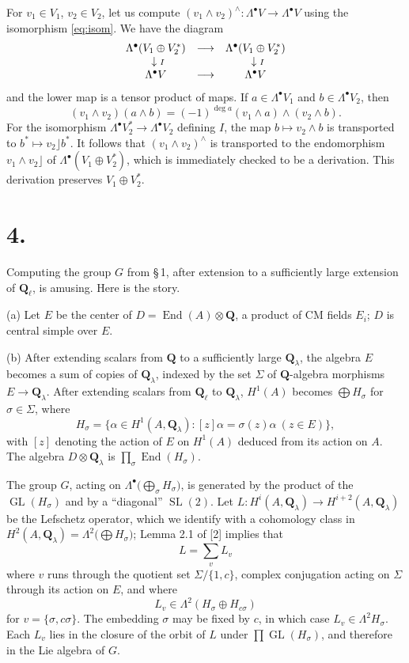 \documentclass[11pt,a4paper]{article}
\theoremstyle{plain}
\theoremstyle{definition}
\DeclareMathOperator{\End}{End}
\DeclareMathOperator{\SL}{SL}
\DeclareMathOperator{\GL}{GL}
\begin{document}
For $v_1 \in V_1$, $v_2 \in V_2$, let us compute $(v_1 \wedge v_2)^\wedge : \Lambda^\bullet V \to \Lambda^\bullet V$ using the isomorphism \eqref{eq:isom}. We have the diagram
\[
\begin{array}{ccc}
\Lambda^\bullet(V_1 \oplus V_2^*) & \longrightarrow & \Lambda^\bullet(V_1 \oplus V_2^*) \\
\downarrow\rlap{$\scriptstyle I$} & & \downarrow\rlap{$\scriptstyle I$} \\
\Lambda^\bullet V & \longrightarrow & \Lambda^\bullet V
\end{array}
\]
and the lower map is a tensor product of maps. If $a \in \Lambda^\bullet V_1$ and $b \in \Lambda^\bullet V_2$, then
\[
(v_1 \wedge v_2)(a \wedge b) = (-1)^{\deg a} (v_1 \wedge a) \wedge (v_2 \wedge b) .
\]
For the isomorphism $\Lambda^\bullet V_2^* \to \Lambda^\bullet V_2$ defining $I$, the map $b \mapsto v_2 \wedge b$ is transported to $b^* \mapsto v_2 \rfloor b^*$. It follows that $(v_1 \wedge v_2)^\wedge$ is transported to the endomorphism $v_1 \wedge v_2 \rfloor$ of $\Lambda^\bullet(V_1 \oplus V_2^*)$, which is immediately checked to be a derivation. This derivation preserves $V_1 \oplus V_2^*$.

\section*{4.}

Computing the group $G$ from \S\,1, after extension to a sufficiently large extension of $\mathbf{Q}_\ell$, is amusing. Here is the story.

(a) Let $E$ be the center of $D = \End(A) \otimes \mathbf{Q}$, a product of CM fields $E_i$; $D$ is central simple over $E$.

(b) After extending scalars from $\mathbf{Q}$ to a sufficiently large $\mathbf{Q}_\lambda$, the algebra $E$ becomes a sum of copies of $\mathbf{Q}_\lambda$, indexed by the set $\Sigma$ of $\mathbf{Q}$-algebra morphisms $E \to \mathbf{Q}_\lambda$. After extending scalars from $\mathbf{Q}_\ell$ to $\mathbf{Q}_\lambda$, $H^1(A)$ becomes $\bigoplus H_\sigma$ for $\sigma \in \Sigma$, where
\[
H_\sigma = \{\alpha \in H^1(A, \mathbf{Q}_\lambda) : [z]\alpha = \sigma(z)\alpha \ (z \in E)\} ,
\]
with $[z]$ denoting the action of $E$ on $H^1(A)$ deduced from its action on $A$. The algebra $D \otimes \mathbf{Q}_\lambda$ is $\prod_\sigma \End(H_\sigma)$.

The group $G$, acting on $\Lambda^\bullet\bigl(\bigoplus_\sigma H_\sigma\bigr)$, is generated by the product of the $\GL(H_\sigma)$ and by a ``diagonal'' $\SL(2)$. Let $L : H^i(A, \mathbf{Q}_\lambda) \to H^{i+2}(A, \mathbf{Q}_\lambda)$ be the Lefschetz operator, which we identify with a cohomology class in $H^2(A, \mathbf{Q}_\lambda) = \Lambda^2\bigl(\bigoplus H_\sigma\bigr)$; Lemma 2.1 of [2] implies that
\[
L = \sum_v L_v
\]
where $v$ runs through the quotient set $\Sigma/\{1, c\}$, complex conjugation acting on $\Sigma$ through its action on $E$, and where
\[
L_v \in \Lambda^2(H_\sigma \oplus H_{c\sigma})
\]
for $v = \{\sigma, c\sigma\}$. The embedding $\sigma$ may be fixed by $c$, in which case $L_v \in \Lambda^2 H_\sigma$. Each $L_v$ lies in the closure of the orbit of $L$ under $\prod \GL(H_\sigma)$, and therefore in the Lie algebra of $G$.
\end{document}
